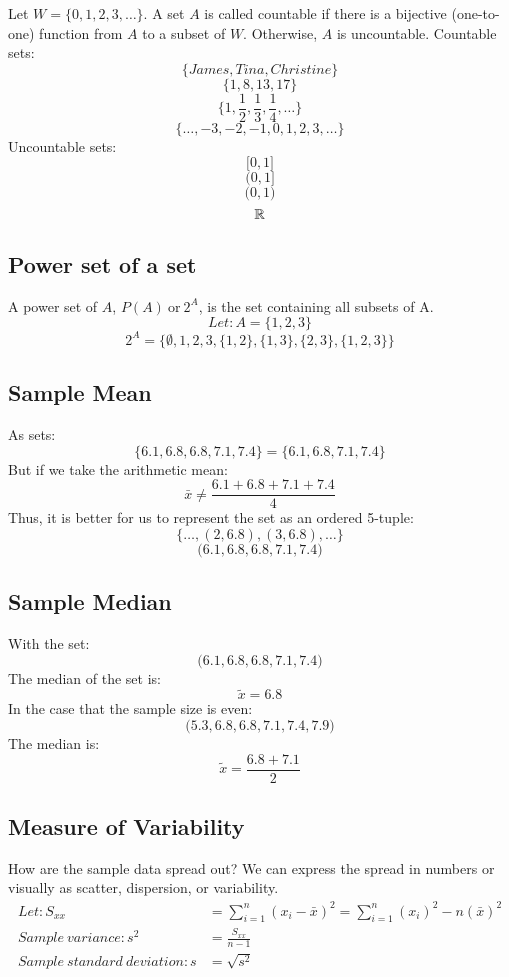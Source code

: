 \documentclass[letterpaper, 12pt]{math}
\begin{document}
Let \( W = \big\{ 0, 1, 2, 3, \dots \big\} \). A set \( A \) is called
countable if there is a bijective (one-to-one) function from \( A \) to a
subset of \( W \). Otherwise, \( A \) is uncountable.
Countable sets:
\[ \bigg\{ James, Tina, Christine \bigg\} \]
\[ \bigg\{ 1, 8, 13, 17 \bigg\} \]
\[ \bigg\{ 1, \frac{1}{2}, \frac{1}{3}, \frac{1}{4}, \dots \bigg\} \]
\[ \bigg\{ \dots, -3, -2, -1, 0, 1, 2, 3, \dots \bigg\} \]
Uncountable sets:
\[ \bigg[ 0, 1 \bigg] \]
\[ \bigg( 0, 1 \bigg] \]
\[ \bigg( 0, 1 \bigg) \]
\[ \mathbb{R} \]

\subsection*{Power set of a set}
A power set of \( A \), \( P(A) \mathrm{\ or\ } 2^{A} \), is the set containing
all subsets of A.
\[ Let: A = \bigg\{ 1, 2, 3 \bigg\} \]
\[ 2^{A} = \bigg\{ \emptyset, 1, 2, 3, \{1, 2\}, \{1, 3\}, \{2, 3\},
   \{1, 2, 3\} \bigg\} \]

\subsection*{Sample Mean}
As sets:
\[ \bigg\{ 6.1, 6.8, 6.8, 7.1, 7.4 \bigg\} =
   \bigg\{ 6.1, 6.8, 7.1, 7.4 \bigg\} \]
But if we take the arithmetic mean:
\[ \bar{x} \neq \frac{6.1+6.8+7.1+7.4}{4} \]
Thus, it is better for us to represent the set as an ordered 5-tuple:
\[ \bigg\{ \dots, (2,6.8), (3,6.8), \dots \bigg \} \]
\[ \bigg( 6.1, 6.8, 6.8, 7.1, 7.4 \bigg) \]

\subsection*{Sample Median}
With the set:
\[ \bigg( 6.1, 6.8, 6.8, 7.1, 7.4 \bigg) \]
The median of the set is:
\[ \tilde{x} = 6.8 \]
In the case that the sample size is even:
\[ \bigg( 5.3, 6.8, 6.8, 7.1, 7.4, 7.9 \bigg) \]
The median is:
\[ \tilde{x} = \frac{6.8+7.1}{2} \]

\subsection*{Measure of Variability}
How are the sample data spread out? We can express the spread in numbers
or visually as scatter, dispersion, or variability.
\begin{align*}
  Let: S_{xx} &= \sum_{i=1}^{n}(x_{i}-\bar{x})^{2} =
    \sum_{i=1}^{n}(x_{i})^{2}-n(\bar{x})^{2} \\
  Sample\ variance: s^{2} &= \frac{S_{xx}}{n-1} \\
  Sample\ standard\ deviation: s &= \sqrt{s^{2}}
\end{align*}
\end{document}
